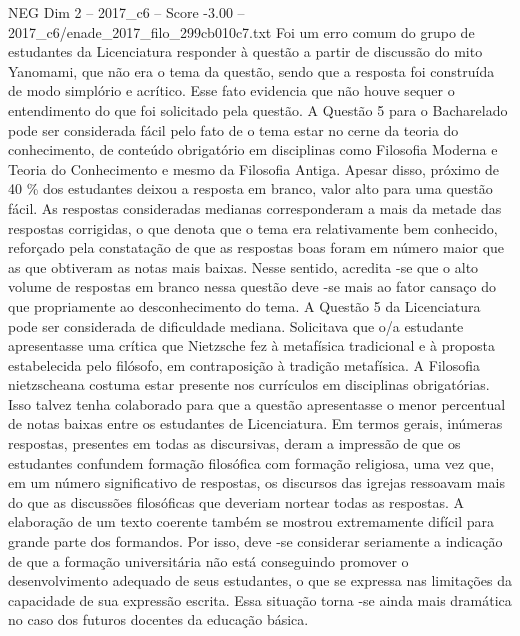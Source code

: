 \begin{textsample}{NEG Dim 2 – 2017\_c6 – Score -3.00 – 2017\_c6/enade\_2017\_filo\_299cb010c7.txt}
Foi um erro comum do grupo de estudantes da Licenciatura responder à questão a partir de discussão do mito Yanomami, que não era o tema da questão, sendo que a resposta foi construída de modo simplório e acrítico.
Esse fato evidencia que não houve sequer o entendimento do que foi solicitado pela questão.
A Questão 5 para o Bacharelado pode ser considerada fácil pelo fato de o tema estar no cerne da teoria do conhecimento, de conteúdo obrigatório em disciplinas como Filosofia Moderna e Teoria do Conhecimento e mesmo da Filosofia Antiga.
Apesar disso, próximo de 40 \% dos estudantes deixou a resposta em branco, valor alto para uma questão fácil.
As respostas consideradas medianas corresponderam a mais da metade das respostas corrigidas, o que denota que o tema era relativamente bem conhecido, reforçado pela constatação de que as respostas boas foram em número maior que as que obtiveram as notas mais baixas.
Nesse sentido, acredita -se que o alto volume de respostas em branco nessa questão deve -se mais ao fator cansaço do que propriamente ao desconhecimento do tema.
A Questão 5 da Licenciatura pode ser considerada de dificuldade mediana.
Solicitava que o/a estudante apresentasse uma crítica que Nietzsche fez à metafísica tradicional e à proposta estabelecida pelo filósofo, em contraposição à tradição metafísica.
A Filosofia nietzscheana costuma estar presente nos currículos em disciplinas obrigatórias.
Isso talvez tenha colaborado para que a questão apresentasse o menor percentual de notas baixas entre os estudantes de Licenciatura.
Em termos gerais, inúmeras respostas, presentes em todas as discursivas, deram a impressão de que os estudantes confundem formação filosófica com formação religiosa, uma vez que, em um número significativo de respostas, os discursos das igrejas ressoavam mais do que as discussões filosóficas que deveriam nortear todas as respostas.
A elaboração de um texto coerente também se mostrou extremamente difícil para grande parte dos formandos.
Por isso, deve -se considerar seriamente a indicação de que a formação universitária não está conseguindo promover o desenvolvimento adequado de seus estudantes, o que se expressa nas limitações da capacidade de sua expressão escrita.
Essa situação torna -se ainda mais dramática no caso dos futuros docentes da educação básica.

\end{textsample}
